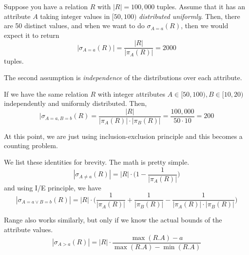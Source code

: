 \documentclass{article}
\begin{document}
    \begin{example}
      Suppose you have a relation $R$ with $|R| = 100,000$ tuples. Assume that it has an attribute $A$ taking integer values in $[50, 100)$ \textit{distributed uniformly}. Then, there are 50 distinct values, and when we want to do $\sigma_{A = a} (R)$, then we would expect it to return 
      \begin{equation}
        |\sigma_{A = a} (R)| = \frac{|R|}{|\pi_A(R)|} = 2000
      \end{equation}
      tuples.
    \end{example}

    The second assumption is \textit{independence} of the distributions over each attribute. 

    \begin{example}
      If we have the same relation $R$ with integer attributes $A \in [50, 100), B \in [10, 20)$ independently and uniformly distributed. Then, 
      \begin{equation}
        |\sigma_{A = a, B = b} (R) = \frac{|R|}{|\pi_A (R)| \cdot |\pi_B(R)|} = \frac{100,000}{50 \cdot 10} = 200
      \end{equation}
    \end{example}

    At this point, we are just using inclusion-exclusion principle and this becomes a counting problem. 

    \begin{example}
      We list these identities for brevity. The math is pretty simple. 
      \begin{equation}
        |\sigma_{A \neq a} (R)| = |R| \cdot \bigg( 1 - \frac{1}{|\pi_A (R)|} \bigg)
      \end{equation}
      and using I/E principle, we have 
      \begin{equation}
        |\sigma_{A = a \lor B = b} (R)| = |R| \cdot \bigg( \frac{1}{|\pi_A (R)|}  + \frac{1}{|\pi_B (R)|} - \frac{1}{|\pi_A (R)| \cdot |\pi_B(R)|} \bigg)
      \end{equation}
    \end{example}

    \begin{example}
      Range also works similarly, but only if we know the actual bounds of the attribute values.  
      \begin{equation}
        |\sigma_{A > a} (R)| = |R| \cdot \frac{\max(R.A) - a}{\max(R.A) - \min(R.A)}
      \end{equation}
    \end{example}
\end{document}
